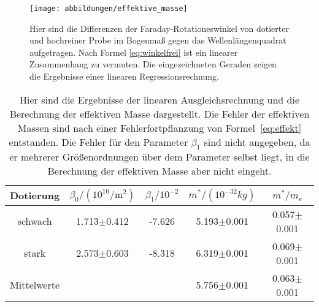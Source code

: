 \begin{figure}
  \centering
  \texttt{[image: abbildungen/effektive\_masse]}
  \caption{Hier sind die Differenzen der Faraday-Rotationeswinkel von 
    dotierter und hochreiner Probe im Bogenmaß gegen das
    Wellenlängenquadrat aufgetragen.  Nach Formel \eqref{eq:winkelfrei}
    ist ein linearer Zusammenhang zu vermuten.  Die eingezeichneten
    Geraden zeigen die Ergebnisse einer linearen Regressionsrechnung.}
  \label{fig:linregress}
\end{figure}

\begin{table}
\centering
  \begin{tabular}{ccccc}
    \toprule
    {Dotierung} &
    {$\beta_0/(10^{10}\si{\per\meter\squared})$}&
    {$\beta_1/10^{-2}$} &
    {$m^*/(10^{-32}\si{kg})$} &
    {$m^*/m_\text{e}$}
    \\
    \midrule
    schwach& 1.713$\pm$0.412 & -7.626 & 5.193$\pm$0.001 & 0.057$\pm$0.001\\
    stark & 2.573$\pm$0.603 & -8.318 & 6.319$\pm$0.001 & 0.069$\pm$0.001 \\
    \midrule
    Mittelwerte & & & 5.756$\pm$0.001 & 0.063$\pm$0.001\\
    \bottomrule
  \end{tabular}
  \caption{Hier sind die Ergebnisse der linearen Ausgleichsrechnung und
    die Berechnung der effektiven Masse dargestellt. Die Fehler der 
    effektiven Massen sind nach einer 
    Fehlerfortpflanzung von Formel~\eqref{eq:effekt} entstanden.
     Die Fehler für den Parameter
    $\beta_1$ sind nicht angegeben, da er mehrerer Größenordnungen über
    dem Parameter selbst liegt, in die Berechnung der effektiven 
     Masse aber nicht eingeht.}
  \label{tab:linregress}
\end{table}
